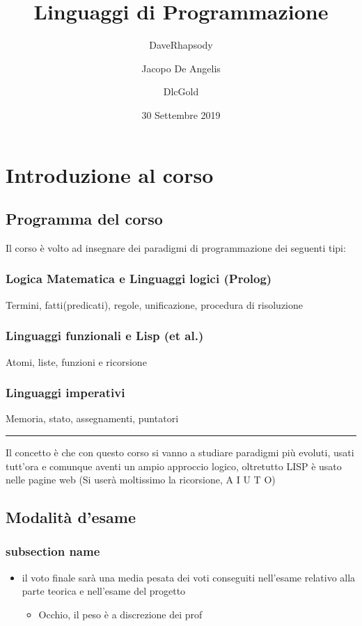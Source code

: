 \documentclass[12pt, a4paper, openany, oneside]{book}
\begin{document}
\author{DaveRhapsody \and Jacopo De Angelis \and DlcGold}
\title{Linguaggi di Programmazione}
\color{blue}
\date{30 Settembre 2019}
\color{black}
\maketitle
\tableofcontents
\chapter{Introduzione al corso}
\section{Programma del corso}
Il corso è volto ad insegnare dei paradigmi di programmazione dei seguenti tipi:
\subsection{Logica Matematica e Linguaggi logici (Prolog)}
Termini, fatti(predicati), regole, unificazione, procedura di risoluzione
\subsection{Linguaggi funzionali e Lisp (et al.)}
Atomi, liste, funzioni e ricorsione
\subsection{Linguaggi imperativi} %
\label{sub:linguaggi_imperativi}
Memoria, stato, assegnamenti, puntatori
\newline 
{\color{black} \rule{\linewidth}{0.3mm} }
\newline
Il concetto è che con questo corso si vanno a studiare paradigmi più evoluti,
usati tutt'ora e comunque aventi un ampio approccio logico, oltretutto LISP è 
usato nelle pagine web (Si userà moltissimo la ricorsione, A I U T O)
\section{Modalità d'esame}
\label{sec:modalità_d_esame}
\subsection{subsection name}
\label{sub:subsection_name}
\begin{itemize}
	\item il voto finale sarà una media pesata dei voti conseguiti nell'esame relativo alla parte teorica e nell'esame del progetto 
	\begin{itemize}
		\item Occhio, il peso è a discrezione dei prof
	\end{itemize}
\end{itemize}
\end{document}
